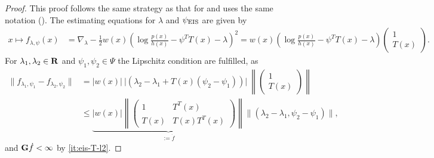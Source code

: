 \begin{proof}
    This proof follows the same strategy as that for  and uses the same notation (). 
    The estimating equations for $\lambda$ and ${\psi_{\text{EIS}}}$ are given by 
    \begin{align*}
    x \mapsto f_{\lambda,\psi}(x) &= \nabla_{\lambda} -\frac{1}{2}w(x)\left(\log \frac{p(x)}{h(x)} - \psi^{T}T(x) -\lambda \right)^{2} = w(x) \left( \log \frac{p(x)}{h(x)} - \psi^{T}T(x) -\lambda  \right)\begin{pmatrix}
        1 \\ T(x)
    \end{pmatrix}.
    \end{align*}
    For $\lambda_{1}, \lambda_{2}\in\mathbf R$ and $\psi_{1}, \psi_{2}\in\Psi$ the Lipschitz condition  are fulfilled, as 
    \begin{align*}
    \lVert f_{\lambda_{1}, \psi_{1}} - f_{\lambda_{2}, \psi_{2}} \rVert &= \lvert w(x) \rvert ~\lvert \left( \lambda_{2} - \lambda_{1} + T(x) \left( \psi_{2} - \psi_{1} \right) \right)\rvert ~\left\lVert \begin{pmatrix}
        1 \\ T(x)
    \end{pmatrix} \right\rVert \\
        &\leq \underbrace{\lvert w(x) \rvert \left\lVert \begin{pmatrix} 1 & T^{T}(x) \\ T(x) & T(x) T^T(x) \end{pmatrix} \right\rVert}_{:=\dot f} \lVert \left( \lambda_{2} - \lambda_{1}, \psi_{2} - \psi_{1} \right)\rVert,
    \end{align*}
    and $\mathbf G \dot f < \infty$ by \ref{it:eis-T-l2}.


\end{proof}
